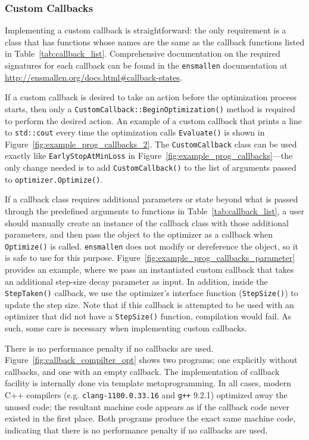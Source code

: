 \subsubsection{Custom Callbacks}

Implementing a custom callback is straightforward:
the only requirement is a class that has functions whose names are the same as the callback
functions listed in Table~\ref{tab:callback_list}.
Comprehensive documentation on the required signatures for each callback can be
found in the {\tt ensmallen} documentation at
\url{http://ensmallen.org/docs.html#callback-states}.

If a custom callback is desired to take an action before the optimization process starts, then only a
{\tt CustomCallback::BeginOptimization()} method is required to perform the desired action.
An example of a custom callback that 
prints a line to {\tt std::cout} every time the optimization calls
{\tt Evaluate()} is shown in Figure~\ref{fig:example_prog_callbacks_2}.
The {\tt CustomCallback} class can be used exactly like {\tt EarlyStopAtMinLoss}
in Figure~\ref{fig:example_prog_callbacks}---the only change
needed is to add {\tt CustomCallback()} to the list of arguments passed to
{\tt optimizer.Optimize()}.

If a callback class requires additional parameters or state beyond what is
passed through the predefined arguments to functions in
Table~\ref{tab:callback_list}, a user should manually create an instance of the
callback class with those additional parameters, and then pass the object to the
optimizer as a callback when {\tt Optimize()} is called.  {\tt ensmallen} does
not modify or dereference the object, so it is safe to use for this purpose.
Figure~\ref{fig:example_prog_callbacks_parameter} provides an example,
where we pass an instantiated custom callback that takes an additional
step-size decay parameter as input.
In addition, inside the {\tt StepTaken()} callback, we use the
optimizer's interface function ({\tt StepSize()}) to update the step size.
Note that  if this callback is attempted to be used with an optimizer that
did not have a {\tt StepSize()} function, compilation would fail.
As such, some care is necessary when implementing custom callbacks.

There is no performance penalty if no callbacks are used.
Figure~\ref{fig:callback_compilter_opt} shows two programs;
one explicitly without callbacks, and one with an empty callback.
The implementation of callback facility is internally
done via template metaprogramming.
In all cases, modern C++ compilers (e.g. {\tt clang-1100.0.33.16} and {\tt g++} 9.2.1)
optimized away the unused code;
the resultant machine code appears as if the callback code never existed
in the first place.
Both programs produce the exact same machine code,
indicating that there is no performance penalty if no callbacks are used.

